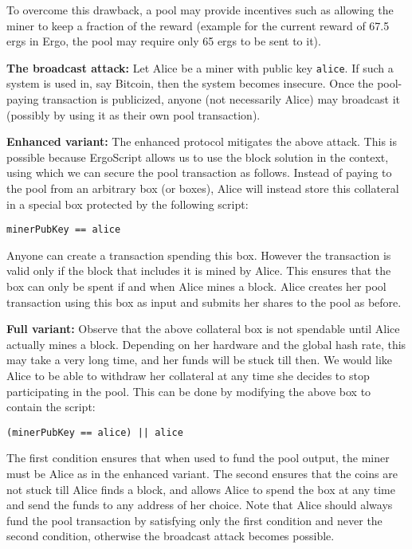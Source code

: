 \documentclass[runningheads]{llncs}
\newcommand{\langname}{ErgoScript\xspace}
\begin{document}
 To overcome this drawback, a pool may provide incentives such as allowing the miner to keep a fraction of the reward (example for the current reward of 67.5 ergs in Ergo, the pool may require only 65 ergs to be sent to it). 

\textbf{The broadcast attack:} Let Alice be a miner with public key \texttt{alice}. If such a system is used in, say Bitcoin, then the system becomes insecure. Once the pool-paying transaction is publicized, anyone (not necessarily Alice) may broadcast it (possibly by using it as their own pool transaction). 

\textbf{Enhanced variant:} The enhanced protocol mitigates the above attack. This is possible because \langname allows us to use the block solution in the context, using which we can secure the pool transaction as follows. Instead of paying to the pool from an arbitrary box (or boxes), Alice will instead store this collateral in a special box protected by the following script:
\begin{verbatim}
minerPubKey == alice
\end{verbatim}

Anyone can create a transaction spending this box. However the transaction is valid only if the block that includes it is mined by Alice. This ensures that the box can only be spent if and when Alice mines a block. 
Alice creates her pool transaction using this box as input and submits her shares to the pool as before. 

\textbf{Full variant:} Observe that the above collateral box is not spendable until Alice actually mines a block. Depending on her hardware and the global hash rate, this may take a very long time, and her funds will be stuck till then. We would like Alice to be able to withdraw her collateral at any time she decides to stop participating in the pool. This can be done by modifying the above box to contain the script:

\begin{verbatim}
(minerPubKey == alice) || alice
\end{verbatim}

The first condition ensures that when used to fund the pool output, the miner must be Alice as in the enhanced variant. The second ensures that the coins are not stuck till Alice finds a block, and allows Alice to spend the box at any time and send the funds to any address of her choice. Note that Alice should always fund the pool transaction by satisfying only the first condition and never the second condition, otherwise the broadcast attack becomes possible.
\end{document}
